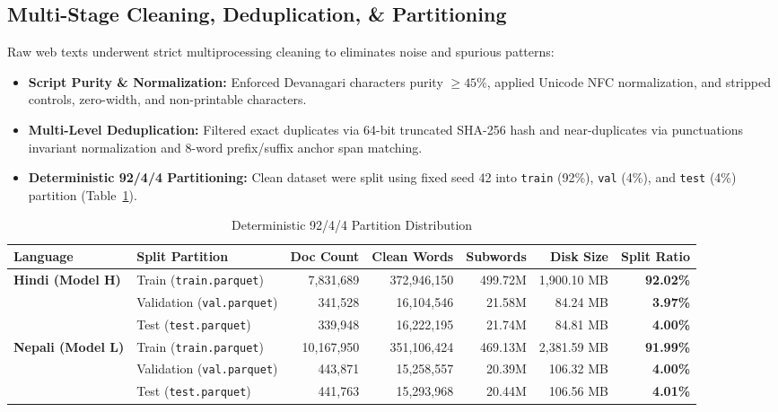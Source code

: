 \documentclass[10pt,a4paper]{article}
\begin{document}
\subsection{Multi-Stage Cleaning, Deduplication, \& Partitioning}
Raw web texts underwent strict multiprocessing cleaning to eliminates noise and spurious patterns:
\begin{itemize}
    \item \textbf{Script Purity \& Normalization:} Enforced Devanagari characters purity $\ge 45\%$, applied Unicode NFC normalization, and stripped controls, zero-width, and non-printable characters.
    \item \textbf{Multi-Level Deduplication:} Filtered exact duplicates via 64-bit truncated SHA-256 hash and near-duplicates via punctuations invariant normalization and 8-word prefix/suffix anchor span matching.
    \item \textbf{Deterministic 92/4/4 Partitioning:} Clean dataset were split using fixed seed 42 into \texttt{train} (92\%), \texttt{val} (4\%), and \texttt{test} (4\%) partition (Table~\ref{tab:splits_table}).
\end{itemize}

\begin{table}[htbp]
\centering
\scriptsize
\caption{Deterministic 92/4/4 Partition Distribution}
\label{tab:splits_table}
\begin{tabular*}{\textwidth}{@{\extracolsep{\fill}}llrrrrr@{}}
\toprule
\textbf{Language} & \textbf{Split Partition} & \textbf{Doc Count} & \textbf{Clean Words} & \textbf{Subwords} & \textbf{Disk Size} & \textbf{Split Ratio} \\
\midrule
\multirow{3}{*}{\textbf{Hindi (Model H)}} 
 & Train (\texttt{train.parquet}) & 7,831,689 & 372,946,150 & 499.72M & 1,900.10 MB & \textbf{92.02\%} \\
 & Validation (\texttt{val.parquet}) & 341,528 & 16,104,546 & 21.58M & 84.24 MB & \textbf{3.97\%} \\
 & Test (\texttt{test.parquet}) & 339,948 & 16,222,195 & 21.74M & 84.81 MB & \textbf{4.00\%} \\
\midrule
\multirow{3}{*}{\textbf{Nepali (Model L)}} 
 & Train (\texttt{train.parquet}) & 10,167,950 & 351,106,424 & 469.13M & 2,381.59 MB & \textbf{91.99\%} \\
 & Validation (\texttt{val.parquet}) & 443,871 & 15,258,557 & 20.39M & 106.32 MB & \textbf{4.00\%} \\
 & Test (\texttt{test.parquet}) & 441,763 & 15,293,968 & 20.44M & 106.56 MB & \textbf{4.01\%} \\
\bottomrule
\end{tabular*}
\end{table}
\end{document}
